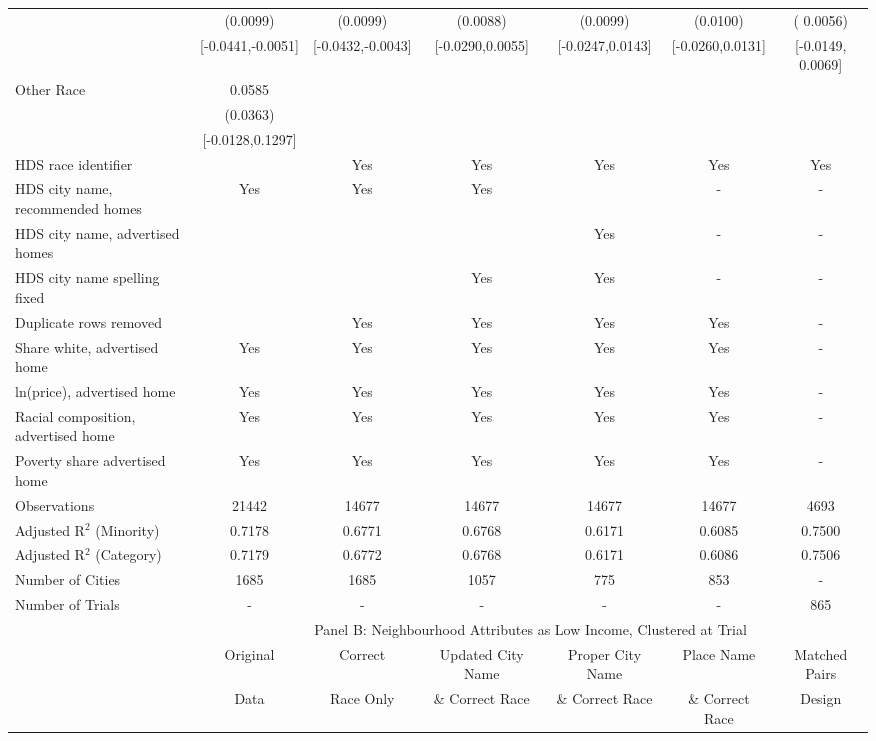 \begin{table}[htbp]
{\begin{tabular}{l*{6}{c}}
 & (0.0099) & (0.0099) & (0.0088) & (0.0099) & (0.0100) & ( 0.0056) \\
 & [-0.0441,-0.0051] & [-0.0432,-0.0043] & [-0.0290,0.0055] & [-0.0247,0.0143] & [-0.0260,0.0131] & [-0.0149,  0.0069] \\
Other Race & 0.0585 &  &  &  &  &  \\
 & (0.0363) &  &  &  &  &  \\
 & [-0.0128,0.1297] &  &  &  &  &  \\
\midrule
HDS race identifier & & Yes & Yes & Yes & Yes & Yes \\
HDS city name, recommended homes & Yes & Yes & Yes & & - & -\\
HDS city name, advertised homes &  &  &  & Yes & - & -\\
HDS city name spelling fixed & & & Yes & Yes & - & -\\
Duplicate rows removed &  & Yes & Yes & Yes & Yes & - \\
\midrule
Share white, advertised home  & Yes & Yes & Yes & Yes & Yes & - \\
ln(price), advertised home  & Yes & Yes & Yes & Yes & Yes & - \\
Racial composition, advertised home & Yes & Yes & Yes & Yes & Yes & - \\
Poverty share advertised home & Yes & Yes & Yes & Yes & Yes & - \\
Observations & 21442 & 14677 & 14677 & 14677 & 14677 & 4693 \\
Adjusted R$^2$ (Minority) & 0.7178 & 0.6771 & 0.6768 & 0.6171 & 0.6085 & 0.7500 \\
Adjusted R$^2$ (Category) & 0.7179 & 0.6772 & 0.6768 & 0.6171 & 0.6086 & 0.7506 \\
Number of Cities & 1685 & 1685 & 1057 & 775 & 853 & - \\
Number of Trials & - & - & - & - & - & 865 \\
\bottomrule
\toprule
& \multicolumn{6}{c}{Panel B: Neighbourhood Attributes as Low Income, Clustered at Trial}\\
\toprule
                    &\multicolumn{1}{c}{Original}&\multicolumn{1}{c}{Correct}&\multicolumn{1}{c}{Updated City Name}&\multicolumn{1}{c}{Proper City Name}&\multicolumn{1}{c}{Place Name}&\multicolumn{1}{c}{Matched Pairs}\\
                      &\multicolumn{1}{c}{Data}&\multicolumn{1}{c}{Race Only}&\multicolumn{1}{c}{\& Correct Race}&\multicolumn{1}{c}{\& Correct Race}&\multicolumn{1}{c}{\& Correct Race}&\multicolumn{1}{c}{Design}\\                  

\end{tabular}}
\end{table}
